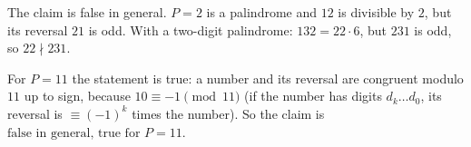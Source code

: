The claim is false in general. $P=2$ is a palindrome and $12$ is divisible by $2$, but its reversal $21$ is odd. With a two-digit palindrome: $132=22\cdot6$, but $231$ is odd, so $22\nmid231$.

For $P=11$ the statement is true: a number and its reversal are congruent modulo $11$ up to sign, because $10\equiv-1\pmod{11}$ (if the number has digits $d_k\ldots d_0$, its reversal is $\equiv(-1)^k$ times the number). So the claim is $\boxed{\text{false in general, true for }P=11}$.
